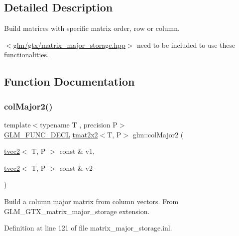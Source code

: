 \subsection{Detailed Description}
Build matrices with specific matrix order, row or column. 

$<$\mbox{\hyperlink{matrix__major__storage_8hpp}{glm/gtx/matrix\+\_\+major\+\_\+storage.\+hpp}}$>$ need to be included to use these functionalities. 

\subsection{Function Documentation}
\mbox{\label{group__gtx__matrix__major__storage_ga599fff4f1c65912b256a82138ebcca37}} 
\subsubsection{\texorpdfstring{colMajor2()}{colMajor2()}\hspace{0.1cm}{\footnotesize\ttfamily [1/2]}}
{\footnotesize\ttfamily template$<$typename T , precision P$>$ \\
\mbox{\hyperlink{setup_8hpp_ab2d052de21a70539923e9bcbf6e83a51}{G\+L\+M\+\_\+\+F\+U\+N\+C\+\_\+\+D\+E\+CL}} \mbox{\hyperlink{structglm_1_1tmat2x2}{tmat2x2}}$<$T, P$>$ glm\+::col\+Major2 (\begin{DoxyParamCaption}\item[{\mbox{\hyperlink{structglm_1_1tvec2}{tvec2}}$<$ T, P $>$ const \&}]{v1,  }\item[{\mbox{\hyperlink{structglm_1_1tvec2}{tvec2}}$<$ T, P $>$ const \&}]{v2 }\end{DoxyParamCaption})}

Build a column major matrix from column vectors. From G\+L\+M\+\_\+\+G\+T\+X\+\_\+matrix\+\_\+major\+\_\+storage extension. 

Definition at line 121 of file matrix\+\_\+major\+\_\+storage.\+inl.

\mbox{\label{group__gtx__matrix__major__storage_ga5cfd25de9d5b4c6a825085f38ddfeff7}} 
